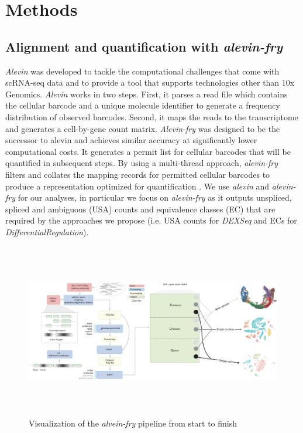 

\chapter{Methods}

\section{Alignment and quantification with \emph{alevin-fry}}
\emph{Alevin} was developed to tackle the computational challenges that come with scRNA-seq data and to provide a tool that supports technologies other than 10x Genomics. \emph{Alevin} works in two steps. First, it parses a read file which contains the cellular barcode and a unique molecule identifier to generate a frequency distribution of observed barcodes. Second, it maps the reads to the transcriptome and generates a cell-by-gene count matrix. \emph{Alevin-fry} \citep{alevin_fry} was designed to be the successor to alevin and achieves similar accuracy at significantly lower computational costs. It generates a permit list for cellular barcodes that will be quantified in subsequent steps. By using a multi-thread approach, \emph{alevin-fry} filters and collates the mapping records for permitted cellular barcodes to produce a representation optimized for quantification \citep{alevin_fry}. We use \emph{alevin} and \emph{alevin-fry} for our analyses, in particular we focus on \emph{alevin-fry} as it outputs unspliced, spliced and ambiguous (USA) counts and equivalence classes (EC) that are required by the approaches we propose (i.e. USA counts for \emph{DEXSeq} and ECs for \emph{DifferentialRegulation}).

\begin{figure}[!htb]
\begin{center}
\includegraphics[width=6in,height=3in]{../figures/alevin_fry_pipeline.png}
\end{center}
\caption{Visualization of the \emph{alvein-fry} pipeline from start to finish \citep{alevin_fry}}
\label{fig:alevin_fry_pipeline}
\end{figure}
\FloatBarrier


